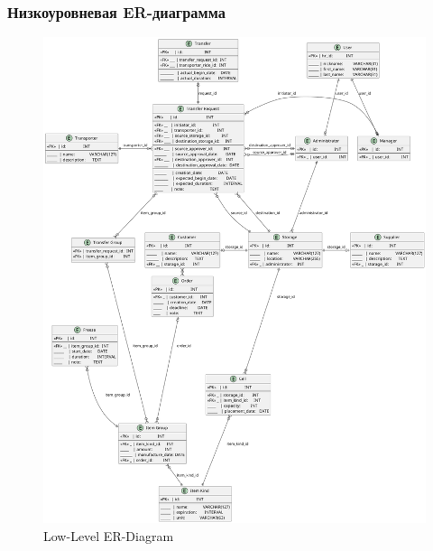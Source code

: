 \newpage

\subsubsection{Низкоуровневая ER-диаграмма}

\begin{figure}[h!]
      \centering
      \includegraphics[width=12cm]{../../out/spec/figure/er/low-level/Storage Net low-level ER Diagram.png}
      \caption{Low-Level ER-Diagram}
\end{figure}

\newpage